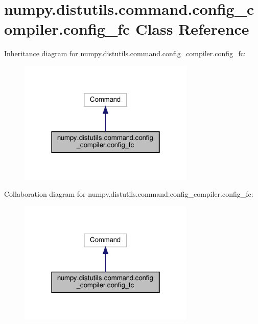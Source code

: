 \hypertarget{classnumpy_1_1distutils_1_1command_1_1config__compiler_1_1config__fc}{}\section{numpy.\+distutils.\+command.\+config\+\_\+compiler.\+config\+\_\+fc Class Reference}
\label{classnumpy_1_1distutils_1_1command_1_1config__compiler_1_1config__fc}


Inheritance diagram for numpy.\+distutils.\+command.\+config\+\_\+compiler.\+config\+\_\+fc\+:
\nopagebreak
\begin{figure}[H]
\begin{center}
\leavevmode
\includegraphics[width=238pt]{classnumpy_1_1distutils_1_1command_1_1config__compiler_1_1config__fc__inherit__graph}
\end{center}
\end{figure}


Collaboration diagram for numpy.\+distutils.\+command.\+config\+\_\+compiler.\+config\+\_\+fc\+:
\nopagebreak
\begin{figure}[H]
\begin{center}
\leavevmode
\includegraphics[width=238pt]{classnumpy_1_1distutils_1_1command_1_1config__compiler_1_1config__fc__coll__graph}
\end{center}
\end{figure}
